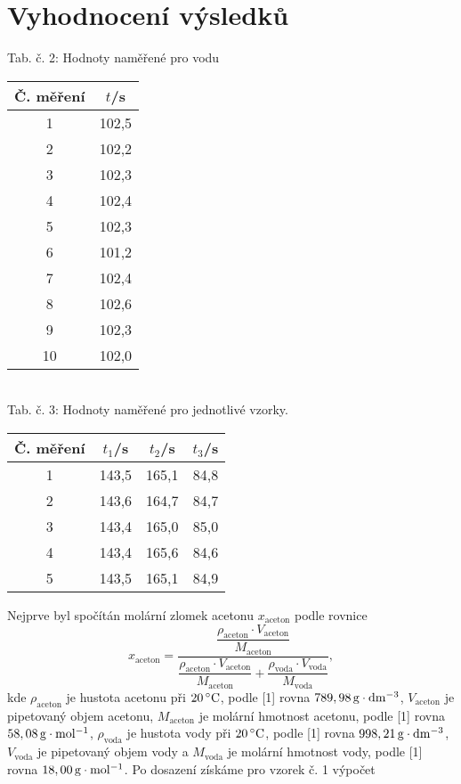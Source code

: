 \documentclass[12pt,a4paper]{article}
\def\ri#1{\mathrm{#1}}
\def\jd#1{\ifmmode\,\mathrm{#1}\else\,\textrm{#1}\fi}
\begin{document}
\section*{Vyhodnocení výsledků}
\begin{center}
	\noindent Tab. č. 2: Hodnoty naměřené pro vodu\\
	\begin{tabular}{c|c}
		Č. měření & $t$/s\\
		\hline
		1 & 102,5\\
		2 & 102,2\\
		3 & 102,3\\
		4 & 102,4\\
		5 & 102,3\\
		6 & 101,2\\
		7 & 102,4\\
		8 & 102,6\\
		9 & 102,3\\
		10 & 102,0\\
	\end{tabular}\\
	\vspace*{10pt}
	\noindent Tab. č. 3: Hodnoty naměřené pro jednotlivé vzorky.\\
	\begin{tabular}{c|c|c|c}
		Č. měření & $t_1$/s & $t_2$/s & $t_3$/s\\
		\hline
		1 & 143,5 & 165,1 & 84,8\\
		2 & 143,6 & 164,7 & 84,7\\
		3 & 143,4 & 165,0 & 85,0\\
		4 & 143,4 & 165,6 & 84,6\\
		5 & 143,5 & 165,1 & 84,9\\
	\end{tabular}
\end{center}
\newpage
\noindent Nejprve byl spočítán molární zlomek acetonu $x_\ri{aceton}$ podle rovnice
\begin{equation}
	x_\ri{aceton} = \dfrac{\dfrac{\rho_\ri{aceton} \cdot V_\ri{aceton}}{M_\ri{aceton}}}{\dfrac{\rho_\ri{aceton} \cdot V_\ri{aceton}}{M_\ri{aceton}}+\dfrac{\rho_\ri{voda} \cdot V_\ri{voda}}{M_\ri{voda}}},
\end{equation}
kde $\rho_\ri{aceton}$ je hustota acetonu při $20\jd{^\circ C}$, podle [1] rovna $789,98\jd{g\cdot dm^\ri{-3}}$,  $V_\ri{aceton}$ je pipetovaný objem acetonu, $M_\ri{aceton}$ je molární hmotnost acetonu, podle [1] rovna $58,08\jd{g\cdot mol^\ri{-1}}$, $\rho_\ri{voda}$ je hustota vody při $20\jd{^\circ C}$, podle [1] rovna $998,21\jd{g\cdot dm^\ri{-3}}$, $V_\ri{voda}$ je pipetovaný objem vody a $M_\ri{voda}$ je molární hmotnost vody, podle [1] rovna $18,00\jd{g\cdot mol^\ri{-1}}$. Po dosazení získáme pro vzorek č. 1 výpočet
\end{document}
